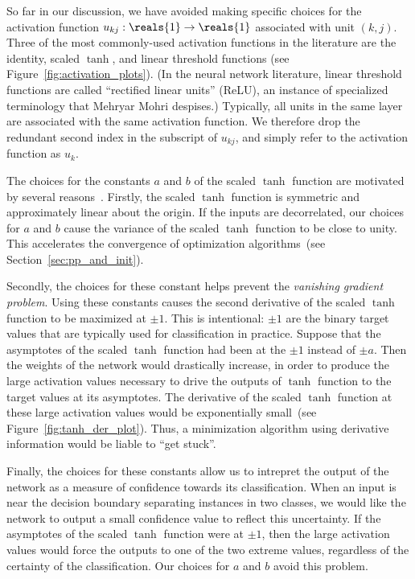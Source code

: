 \documentclass[11pt,a4paper]{article}
\numberwithin{equation}{section}
\begin{document}
So far in our discussion, we have avoided making specific choices for the
activation function $u_{kj} : \reals{1} \to \reals{1}$ associated with unit $(k,
j)$. Three of the most commonly-used activation functions in the literature are
the identity, scaled $\tanh$, and linear threshold functions (see
Figure~\ref{fig:activation_plots}). (In the neural network literature, linear
threshold functions are called ``rectified linear units'' (ReLU), an instance of
specialized terminology that Mehryar Mohri despises.) Typically, all units in
the same layer are associated with the same activation function. We therefore
drop the redundant second index in the subscript of $u_{kj}$, and simply refer
to the activation function as $u_k$.

The choices for the constants $a$ and $b$ of the scaled $\tanh$ function are
motivated by several reasons~\citep{lecun-98b}. Firstly, the scaled $\tanh$
function is symmetric and approximately linear about the origin. If the inputs
are decorrelated, our choices for $a$ and $b$ cause the variance of the scaled
$\tanh$ function to be close to unity. This accelerates the convergence of
optimization algorithms~(see Section~\ref{sec:pp_and_init}).

Secondly, the choices for these constant helps prevent the \emph{vanishing
gradient problem}. Using these constants causes the second derivative of the
scaled $\tanh$ function to be maximized at $\pm 1$. This is intentional: $\pm 1$
are the binary target values that are typically used for classification in
practice. Suppose that the asymptotes of the scaled $\tanh$ function had been at
the $\pm 1$ instead of $\pm a$. Then the weights of the network would
drastically increase, in order to produce the large activation values necessary
to drive the outputs of $\tanh$ function to the target values at its asymptotes.
The derivative of the scaled $\tanh$ function at these large activation values
would be exponentially small~(see Figure~\ref{fig:tanh_der_plot}). Thus, a
minimization algorithm using derivative information would be liable to ``get
stuck''.

Finally, the choices for these constants allow us to intrepret the output of the
network as a measure of confidence towards its classification. When an input is
near the decision boundary separating instances in two classes, we would like
the network to output a small confidence value to reflect this uncertainty. If
the asymptotes of the scaled $\tanh$ function were at $\pm 1$, then the large
activation values would force the outputs to one of the two extreme values,
regardless of the certainty of the classification. Our choices for $a$ and $b$
avoid this problem.
\end{document}
